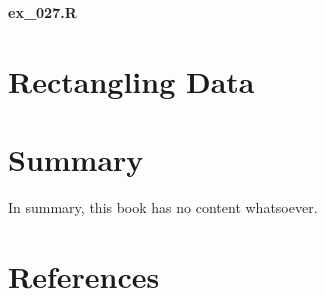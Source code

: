 \documentclass[
  letterpaper,
  DIV=11,
  numbers=noendperiod]{scrreprt}
\newenvironment{Shaded}{\begin{snugshade}}{\end{snugshade}}
\newlength{\cslhangindent}
\newlength{\cslentryspacingunit} %
\newenvironment{CSLReferences}[2] %
 {%
  \setlength{\parindent}{0pt}
  \ifodd #1
  \let\oldpar\par
  \def\par{\hangindent=\cslhangindent\oldpar}
  \fi
  \setlength{\parskip}{#2\cslentryspacingunit}
 }%
 {}
\begin{document}
\textbf{ex\_027.R}

\begin{Shaded}
\begin{Highlighting}[]

\end{Highlighting}
\end{Shaded}


\hypertarget{rectangling-data}{%
\chapter{Rectangling Data}\label{rectangling-data}}


\hypertarget{summary}{%
\chapter{Summary}\label{summary}}

In summary, this book has no content whatsoever.


\hypertarget{references}{%
\chapter*{References}\label{references}}


\hypertarget{refs}{}
\begin{CSLReferences}{0}{0}
\end{CSLReferences}
\end{document}
